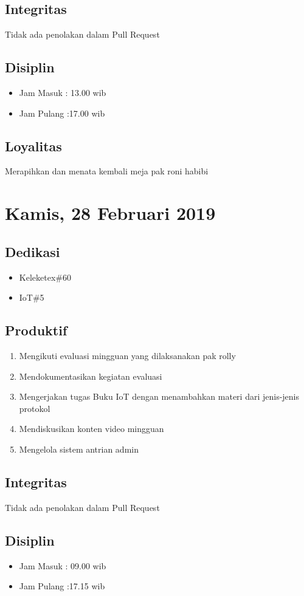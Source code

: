 \subsection{Integritas}
Tidak ada penolakan dalam Pull Request
\subsection{Disiplin}
\begin{itemize}
\item Jam Masuk : 13.00 wib
\item Jam Pulang :17.00 wib
\end{itemize}
\subsection{Loyalitas}
Merapihkan dan menata kembali meja pak roni habibi

\section{Kamis, 28 Februari 2019}
\subsection{Dedikasi}
\begin{itemize}
\item Keleketex\#60
\item IoT\#5
\end{itemize}
\subsection{Produktif}
\begin{enumerate}
\item Mengikuti evaluasi mingguan yang dilaksanakan pak rolly
\item Mendokumentasikan kegiatan evaluasi
\item Mengerjakan tugas Buku IoT dengan menambahkan materi dari jenis-jenis protokol
\item Mendiskusikan konten video mingguan
\item Mengelola sistem antrian admin
\end{enumerate}
\subsection{Integritas}
Tidak ada penolakan dalam Pull Request
\subsection{Disiplin}
\begin{itemize}
\item Jam Masuk : 09.00 wib
\item Jam Pulang :17.15 wib
\end{itemize}
